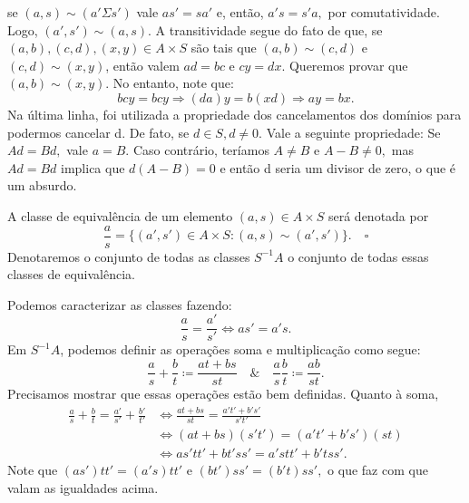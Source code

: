 \documentclass[algebraII_notes.tex]{subfiles}
\begin{document}
se \((a, s)\sim (a'\Sigma s')\) vale \(as' = sa'\) e, então, \(a's = s'a, \) por comutatividade.
Logo, \((a', s')\sim (a, s).\) A transitividade segue do fato de que, se \((a, b), (c, d), (x, y)\in A\times S\) são
tais que \((a, b)\sim (c, d)\) e \((c, d)\sim (x, y)\), então valem \(ad = bc\) e \(cy = dx.\) Queremos provar
que \((a, b)\sim (x, y)\). No entanto, note que:
\[
	bcy = bcy \Rightarrow (da)y = b(xd) \Rightarrow ay = bx.
\]
Na última linha, foi utilizada a propriedade dos cancelamentos dos domínios para podermos cancelar d. De fato, se \(d\in S, d\neq 0.\)
Vale a seguinte propriedade: Se \(Ad = Bd,\) vale \(a = B.\) Caso contrário, teríamos \(A\neq B\) e \(A - B\neq 0,\) mas \(Ad = Bd\) implica que
\(d(A-B) = 0\) e então d seria um divisor de zero, o que é um absurdo.

\begin{def*}
	A classe de equivalência de um elemento \((a, s)\in A\times S\) será denotada por
	\[
		\frac{a}{s} = \{(a', s')\in A\times S: (a, s)\sim (a', s')\}.\quad\square
	\]
	Denotaremos o conjunto de todas as classes \(S^{-1}A\) o conjunto de todas essas classes de equivalência.
\end{def*}
Podemos caracterizar as classes fazendo:
\[
	\frac{a}{s} = \frac{a'}{s'} \Longleftrightarrow as'=a's.
\]
Em \(S^{-1}A\), podemos definir as operações soma e multiplicação como segue:
\[
	\frac{a}{s}+\frac{b}{t}\coloneqq \frac{at+bs}{st}\quad\&\quad \frac{a}{s}\frac{b}{t}\coloneqq \frac{ab}{st}.
\]
Precisamos mostrar que essas operações estão bem definidas. Quanto à soma,
\begin{align*}
	\frac{a}{s} + \frac{b}{t} = \frac{a'}{s'} + \frac{b'}{t'} & \Longleftrightarrow \frac{at+bs}{st} = \frac{a't' + b's'}{s't'} \\
	                                                          & \Longleftrightarrow (at+bs)(s't') = (a't'+b's')(st)             \\
	                                                          & \Longleftrightarrow as't t'+bt'ss' = a'st t' + b'tss'.
\end{align*}
Note que \((as')t t' = (a's)t t'\) e \((bt')ss' = (b't)ss',\) o que faz com que valam as igualdades acima.
\end{document}
